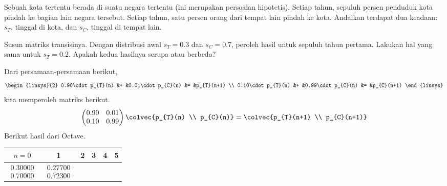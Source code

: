 \begin{exercises}
     Sebuah kota tertentu berada di suatu negara tertentu
     (ini merupakan persoalan hipotetis).
     Setiap tahun, sepuluh persen penduduk kota pindah ke bagian lain negara
     tersebut. Setiap tahun, satu persen orang dari tempat lain pindah ke kota.
     Andaikan terdapat dua keadaan: $s_T$, tinggal di kota, dan $s_C$, tinggal
     di tempat lain.
     \begin{exparts}
       \partsitem Susun matriks transisinya.
       \partsitem Dengan distribusi awal $s_T=0.3$ dan $s_C=0.7$, peroleh
         hasil untuk sepuluh tahun pertama.
       \partsitem Lakukan hal yang sama untuk $s_T=0.2$.
       \partsitem Apakah kedua hasilnya serupa atau berbeda?
     \end{exparts}
     \begin{answer}
       \begin{exparts}
         \partsitem Dari persamaan-persamaan berikut,
           \begin{equation*}
             \begin{linsys}{2}
               0.90\cdot p_{T}(n)  &+  &0.01\cdot p_{C}(n) &= &p_{T}(n+1)   \\
               0.10\cdot p_{T}(n)  &+  &0.99\cdot p_{C}(n) &= &p_{C}(n+1)   
             \end{linsys}
           \end{equation*}
           kita memperoleh matriks berikut.
           \begin{equation*}
             \begin{pmatrix}
               0.90  &0.01  \\
               0.10  &0.99
             \end{pmatrix}
             \colvec{p_{T}(n) \\ p_{C}(n)}
             =
             \colvec{p_{T}(n+1) \\ p_{C}(n+1)}
           \end{equation*}
         \partsitem Berikut hasil dari Octave.
           \begin{center}
             \begin{tabular}{c|ccccc}
               $n=0$ &1  &2  &3  &4  &5  \\ 
               \hline
               $\begin{array}{c}  0.30000 \\ 0.70000 \end{array}$
               &$\begin{array}{c} 0.27700 \\ 0.72300 \end{array}$

\end{tabular}
\end{center}
\end{exparts}
\end{answer}
\end{exercises}
